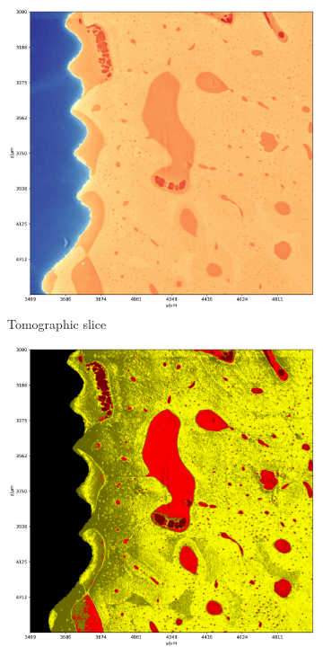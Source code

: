 \begin{figure}
  \centering
    \begin{subfigure}{0.5\textwidth}
      \centering
      \includegraphics[width=\linewidth]{generated/770c_pag_segmented_zy_raw.pdf}
      \caption{Tomographic slice}
    \end{subfigure}%
    \begin{subfigure}{0.5\textwidth}
      \centering
      \includegraphics[width=\linewidth]{generated/770c_pag_global_zy.pdf}

\end{subfigure}
\end{figure}
